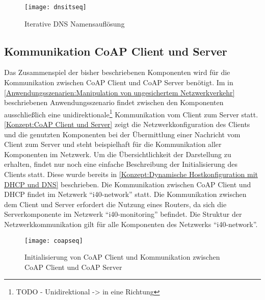 \begin{figure}[h]
  \centering
  \texttt{[image: dnsitseq]}
  \caption{Iterative DNS Namensauflösung} 
  \label{Konzept:Iterative DNS Namensauflösung}
\end{figure}

\subsection{Kommunikation CoAP Client und Server}
Das Zusammenspiel der bisher beschriebenen Komponenten wird für die Kommunikation zwischen \ac{CoAP} Client und \ac{CoAP} Server benötigt. Im in \autoref{Anwendungsszenarien:Manipulation von ungesichertem Netzwerkverkehr} beschriebenen Anwendungsszenario findet zwischen den Komponenten ausschließlich eine unidirektionale\footnote{TODO - Unidirektional -> in eine Richtung} Kommunikation vom Client zum Server statt. \autoref{Konzept:CoAP Client und Server} zeigt die Netzwerkkonfiguration des Clients und die genutzten Komponenten bei der Übermittlung einer Nachricht vom Client zum Server und steht beispielhaft für die Kommunikation aller Komponenten im Netzwerk. Um die Übersichtlichkeit der Darstellung zu erhalten, findet nur noch eine einfache Beschreibung der Initialisierung des Clients statt. Diese wurde bereits in \autoref{Konzept:Dynamische Hostkonfiguration mit DHCP und DNS} beschrieben. Die Kommunikation zwischen \ac{CoAP} Client und \ac{DHCP} findet im Netzwerk "`i40-network"' statt. Die Kommunikation zwischen dem Client und Server erfordert die Nutzung eines Routers, da sich die Serverkomponente im Netzwerk "`i40-monitoring"' befindet. Die Struktur der Netzwerkkommunikation gilt für alle Komponenten des Netzwerks "`i40-network"'.

\begin{figure}[h]
  \centering
  \texttt{[image: coapseq]}
  \caption{Initialisierung von CoAP Client und Kommunikation zwischen CoAP Client und CoAP Server} 
  \label{Konzept:CoAP Client und Server}
\end{figure}

